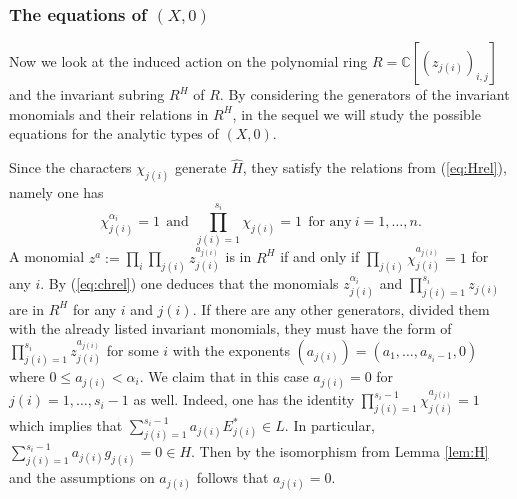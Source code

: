 \documentclass[oneside]{amsart}
\numberwithin{equation}{section}
\numberwithin{equation}{subsection}
\theoremstyle{plain}
\theoremstyle{definition}
\def\C{\mathbb C}
\newcommand{\al}{\alpha}
\begin{document}
\subsubsection{\bf The equations of $(X,0)$}

Now we look at the induced action on the polynomial ring $R=\C[(z_{j(i)})_{i,j}]$ and the invariant subring $R^H$ of $R$. By considering the generators of the invariant monomials and their relations in $R^H$, in the sequel we will study  the possible equations for the analytic types of $(X,0)$.

Since the characters $\chi_{j(i)}$ generate $\hat{H}$, they satisfy the relations from (\ref{eq:Hrel}), namely one has 
\begin{equation}\label{eq:chrel}
\chi_{j(i)}^{\al_i}=1 \ \ \mbox{and} \ \ \prod_{j(i)=1}^{s_i}\chi_{j(i)}=1 \ \ \mbox{for any} \ i=1,\dots,n.
\end{equation}
A monomial $z^{a}:=\prod_{i}\prod_{j(i)} z_{j(i)}^{a_{j(i)}}$ is in $R^H$ if and only if $\prod_{j(i)}\chi_{j(i)}^{a_{j(i)}}=1$ for any $i$. By (\ref{eq:chrel}) one deduces that the monomials $z^{\al_i}_{j(i)}$ and $\prod_{j(i)=1}^{s_i}z_{j(i)}$ are in $R^H$ for any $i$ and $j(i)$. If there are any other generators, divided them with the already listed invariant monomials, they must have the form of $\prod_{j(i)=1}^{s_i}z^{a_{j(i)}}_{j(i)}$ for some $i$ with the exponents $(a_{j(i)})=(a_1,\dots,a_{s_i-1},0)$ where $0\leq a_{j(i)}<\al_i$. We claim that in this case $a_{j(i)}=0$ for $j(i)=1,\dots,s_i-1$ as well. 
Indeed, one has the identity $\prod_{j(i)=1}^{s_i-1}\chi^{a_{j(i)}}_{j(i)}=1$ which implies that $\sum_{j(i)=1}^{s_i-1}a_{j(i)}E^*_{j(i)}\in L$. In particular, $\sum_{j(i)=1}^{s_i-1}a_{j(i)}g_{j(i)}=0 \in H$. Then by the isomorphism from Lemma  \ref{lem:H} and the assumptions on $a_{j(i)}$ follows that $a_{j(i)}=0$. 
\end{document}
